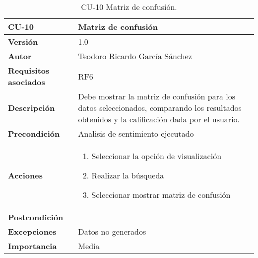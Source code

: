 \begin{table}[p]
	\centering
	\begin{tabularx}{\linewidth}{ p{} p{} }
		\toprule
		\textbf{CU-10}    & \textbf{Matriz de confusión}\\
		\toprule
		\textbf{Versión}              & 1.0    \\
		\textbf{Autor}                & Teodoro Ricardo García Sánchez \\
		\textbf{Requisitos asociados} & RF6 \\
		\textbf{Descripción}          & Debe mostrar la matriz de confusión para los datos seleccionados, comparando los resultados obtenidos y la calificación dada por el usuario.  \\
		\textbf{Precondición}         & Analisis de sentimiento ejecutado \\
		\textbf{Acciones}             &
		\begin{enumerate}
			\def\labelenumi{\arabic{enumi}.}
			\tightlist
			\item Seleccionar la opción de visualización
			\item Realizar la búsqueda
			\item Seleccionar mostrar matriz de confusión
		\end{enumerate}\\
		\textbf{Postcondición}        &  \\
		\textbf{Excepciones}          & Datos no generados \\
		\textbf{Importancia}          & Media \\
		\bottomrule
	\end{tabularx}
	\caption{CU-10 Matriz de confusión.}
\end{table}

